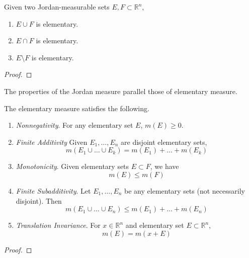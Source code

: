   \begin{lemma}
    Given two Jordan-measurable sets $E, F \subset \mathbb{R}^n$, 
    \begin{enumerate}
      \item $E \cup F$ is elementary. 
      \item $E \cap F$ is elementary. 
      \item $E \setminus F$ is elementary. 
    \end{enumerate}
  \end{lemma}
  \begin{proof}
    
  \end{proof}

  The properties of the Jordan measure parallel those of elementary measure. 

  \begin{theorem}
    The elementary measure satisfies the following. 
    \begin{enumerate}
      \item \textit{Nonnegativity}. For any elementary set $E$, $m(E) \geq 0$. 
      \item \textit{Finite Additivity} Given $E_1, \ldots, E_n$ are disjoint elementary sets, 
      \begin{equation}
        m(E_1 \cup \ldots \cup E_k) = m(E_1) + \ldots + m(E_k)
      \end{equation}

      \item \textit{Monotonicity}. Given elementary sets $E \subset F$, we have 
      \begin{equation}
        m(E) \leq m(F)
      \end{equation}

      \item \textit{Finite Subadditivity}. Let $E_1, \ldots, E_n$ be any elementary sets (not necessarily disjoint). Then 
      \begin{equation}
        m(E_1 \cup \ldots \cup E_n) \leq m(E_1) + \ldots + m(E_n)
      \end{equation}

      \item \textit{Translation Invariance}. For $x \in \mathbb{R}^n$ and elementary set $E \subset \mathbb{R}^n$, 
      \begin{equation}
        m(E) = m(x + E) 
      \end{equation}
    \end{enumerate}
  \end{theorem}
  \begin{proof}
    
  \end{proof}

